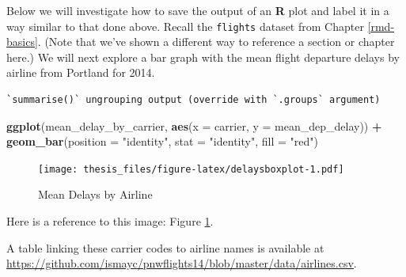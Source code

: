 \documentclass[12pt,twoside]{reedthesis}
\newenvironment{Shaded}{\begin{snugshade}}{\end{snugshade}}
\newcommand{\DataTypeTok}[1]{\textcolor[rgb]{0.13,0.29,0.53}{#1}}
\newcommand{\KeywordTok}[1]{\textcolor[rgb]{0.13,0.29,0.53}{\textbf{#1}}}
\newcommand{\NormalTok}[1]{#1}
\newcommand{\OperatorTok}[1]{\textcolor[rgb]{0.81,0.36,0.00}{\textbf{#1}}}
\newcommand{\StringTok}[1]{\textcolor[rgb]{0.31,0.60,0.02}{#1}}
\begin{document}
Below we will investigate how to save the output of an \textbf{R} plot and label it in a way similar to that done above. Recall the \texttt{flights} dataset from Chapter \ref{rmd-basics}. (Note that we've shown a different way to reference a section or chapter here.) We will next explore a bar graph with the mean flight departure delays by airline from Portland for 2014.
\begin{Shaded}
\end{Shaded}
\begin{verbatim}
`summarise()` ungrouping output (override with `.groups` argument)
\end{verbatim}
\begin{Shaded}
\begin{Highlighting}[]
\KeywordTok{ggplot}\NormalTok{(mean_delay_by_carrier, }\KeywordTok{aes}\NormalTok{(}\DataTypeTok{x =}\NormalTok{ carrier, }\DataTypeTok{y =}\NormalTok{ mean_dep_delay)) }\OperatorTok{+}
\StringTok{  }\KeywordTok{geom_bar}\NormalTok{(}\DataTypeTok{position =} \StringTok{"identity"}\NormalTok{, }\DataTypeTok{stat =} \StringTok{"identity"}\NormalTok{, }\DataTypeTok{fill =} \StringTok{"red"}\NormalTok{)}
\end{Highlighting}
\end{Shaded}
\begin{figure}
\centering
\texttt{[image: thesis\_files/figure-latex/delaysboxplot-1.pdf]}
\caption{\label{fig:delaysboxplot}Mean Delays by Airline}
\end{figure}
Here is a reference to this image: Figure \ref{fig:delaysboxplot}.

A table linking these carrier codes to airline names is available at \url{https://github.com/ismayc/pnwflights14/blob/master/data/airlines.csv}.

\clearpage
\end{document}
